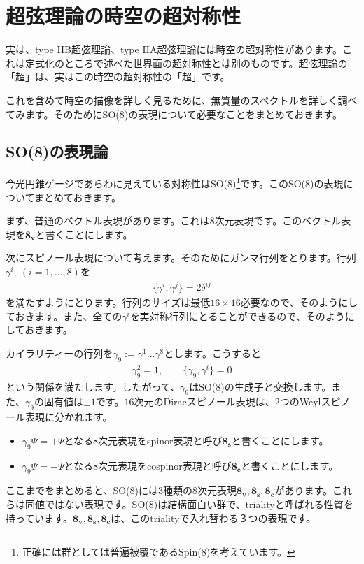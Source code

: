 \documentclass[report,paper=a4, fontsize=12pt, line_length=16cm, number_of_lines=34,dvipdfmx]{jlreq}
\numberwithin{equation}{chapter}
\numberwithin{equation}{section}
\newcommand{\etv}{\mathbf{8_v}}
\newcommand{\ets}{\mathbf{8_s}}
\newcommand{\etc}{\mathbf{8_c}}
\begin{document}
\section{超弦理論の時空の超対称性}
実は、type IIB超弦理論、type IIA超弦理論には時空の超対称性があります。これは定式化のところで述べた世界面の超対称性とは別のものです。超弦理論の「超」は、実はこの時空の超対称性の「超」です。

これを含めて時空の描像を詳しく見るために、無質量のスペクトルを詳しく調べてみます。そのためにSO(8)の表現について必要なことをまとめておきます。

\subsection{SO(8)の表現論}
今光円錐ゲージであらわに見えている対称性はSO(8)\footnote{正確には群としては普遍被覆であるSpin(8)を考えています。}です。このSO(8)の表現についてまとめておきます。

まず、普通のベクトル表現があります。これは$8$次元表現です。このベクトル表現を$\etv$と書くことにします。

次にスピノール表現について考えます。そのためにガンマ行列をとります。行列$\gamma^{i},\ (i=1,\dots,8)$を
\begin{align}
  \{\gamma^{i},\gamma^{j}\}=2\delta^{ij}
\end{align}
を満たすようにとります。行列のサイズは最低$16\times 16$必要なので、そのようにしておきます。また、全ての$\gamma^{i}$を実対称行列にとることができるので、そのようにしておきます。

カイラリティーの行列を$\gamma_9:=\gamma^{1}\dots \gamma^{8}$とします。こうすると
\begin{align}
  \gamma_9^{2}=1,\qquad \{\gamma_9,\gamma^{i}\}=0
\end{align}
という関係を満たします。したがって、$\gamma_9$はSO(8)の生成子と交換します。また、$\gamma_9$の固有値は$\pm 1$です。$16$次元のDiracスピノール表現は、2つのWeylスピノール表現に分かれます。
\begin{itemize}
  \item $\gamma_9\Psi = +\Psi$となる8次元表現をspinor表現と呼び$\ets$と書くことにします。
  \item $\gamma_9\Psi = -\Psi$となる8次元表現をcospinor表現と呼び$\etc$と書くことにします。
\end{itemize}

ここまでをまとめると、SO(8)には3種類の8次元表現$\etv,\ets,\etc$があります。これらは同値ではない表現です。SO(8)は結構面白い群で、trialityと呼ばれる性質を持っています。$\etv,\ets,\etc$は、このtrialityで入れ替わる３つの表現です。
\end{document}
